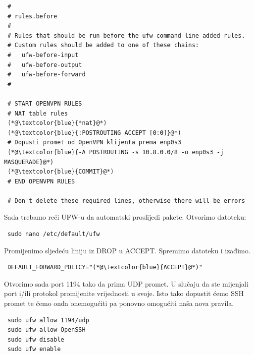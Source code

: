 \begin{lstlisting}
 #
 # rules.before
 #
 # Rules that should be run before the ufw command line added rules. 
 # Custom rules should be added to one of these chains:
 #   ufw-before-input
 #   ufw-before-output
 #   ufw-before-forward
 #
 
 # START OPENVPN RULES
 # NAT table rules
 (*@\textcolor{blue}{*nat}@*)
 (*@\textcolor{blue}{:POSTROUTING ACCEPT [0:0]}@*)
 # Dopusti promet od OpenVPN klijenta prema enp0s3 
 (*@\textcolor{blue}{-A POSTROUTING -s 10.8.0.0/8 -o enp0s3 -j MASQUERADE}@*)
 (*@\textcolor{blue}{COMMIT}@*)
 # END OPENVPN RULES
 
 # Don't delete these required lines, otherwise there will be errors
\end{lstlisting}
Sada trebamo reći UFW-u da automatski proslijedi pakete. Otvorimo datoteku:
\begin{lstlisting}
 sudo nano /etc/default/ufw
\end{lstlisting}
Promijenimo sljedeću liniju iz DROP u ACCEPT. Spremimo datoteku i izađimo.
\begin{lstlisting}
 DEFAULT_FORWARD_POLICY="(*@\textcolor{blue}{ACCEPT}@*)"
\end{lstlisting}
Otvorimo sada port 1194 tako da prima UDP promet. U slučaju da ste mijenjali port i/ili protokol promijenite vrijednosti u svoje. Isto tako dopustit ćemo SSH promet te ćemo onda onemogućiti pa ponovno omogućiti naša nova pravila.
\begin{lstlisting}
 sudo ufw allow 1194/udp
 sudo ufw allow OpenSSH
 sudo ufw disable
 sudo ufw enable
\end{lstlisting}
\bigbreak
